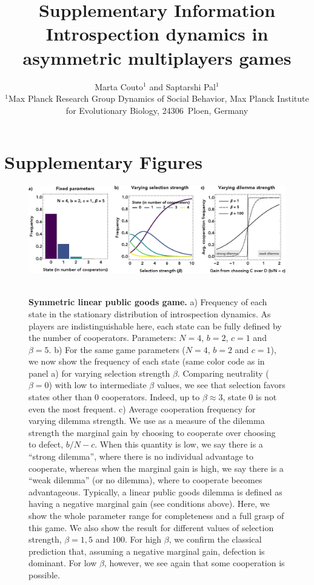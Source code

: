 \documentclass[11pt]{article}
\title{\sffamily \Large Supplementary Information\\[0.1cm] {\bfseries Introspection dynamics in asymmetric multiplayers games}}
\date{\empty}
\author{\parbox[c]{16cm}{\centering \onehalfspacing \fontsize{11}{12}\selectfont Marta Couto$^1$ and Saptarshi Pal$^1$\\[0.2cm]
$^1$Max Planck Research Group Dynamics of Social Behavior, Max Planck Institute for Evolutionary Biology, 24306~Ploen, Germany}}
\theoremstyle{plainCl1}
\theoremstyle{plainCl2}
\begin{document}
\maketitle
\onehalfspacing
\section*{Supplementary Figures}
\begin{figure}[h!]
\centering
\includegraphics[width =  \textwidth]{figures/figure1.eps}~\\[0.4cm]
\caption{\onehalfspacing
\textbf{Symmetric linear public goods game.}
a) Frequency of each state in the stationary distribution of introspection dynamics. As players are indistinguishable here, each state can be fully defined by the number of cooperators. Parameters: $N = 4$, $b = 2$, $c = 1$ and $\beta = 5$. b) For the same game parameters ($N = 4$, $b = 2$ and $c = 1$), we now show the frequency of each state (same color code as in panel a) for varying selection strength $\beta$. Comparing neutrality ($\beta = 0$) with low to intermediate $\beta$ values, we see that selection favors states other than 0 cooperators. Indeed, up to $\beta \approx 3$, state $0$ is not even the most frequent. c) Average cooperation frequency for varying dilemma strength. We use as a measure of the dilemma strength the marginal gain by choosing to cooperate over choosing to defect, $b/N - c$. When this quantity is low, we say there is a ``strong dilemma”, where there is no individual advantage to cooperate, whereas when the marginal gain is high, we say there is a ``weak dilemma” (or no dilemma), where to cooperate becomes advantageous. Typically, a linear public goods dilemma is defined as having a negative marginal gain (see conditions above). Here, we show the whole parameter range for completeness and a full grasp of this game. We also show the result for different values of selection strength, $\beta = 1, 5$ and $100$. For high $\beta$, we confirm the classical prediction that, assuming a negative marginal gain, defection is dominant. For low $\beta$, however, we see again that some cooperation is possible. }
\label{Fig:LPGG-symmetric}
\end{figure}
\clearpage
\end{document}

